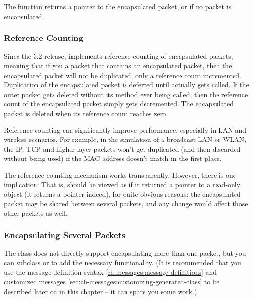 The  function returns a pointer to the encapsulated
packet, or  if no packet is encapsulated.


\subsubsection{Reference Counting}
\label{ch:messages:reference-counting}

Since the 3.2 release, {\opp} implements reference counting of
encapsulated packets, meaning that if you  a packet
that contains an encapsulated packet, then the encapsulated packet will
not be duplicated, only a reference count incremented. Duplication of
the encapsulated packet is deferred until 
actually gets called. If the outer packet gets deleted without its
 method ever being called, then the reference
count of the encapsulated packet simply gets decremented. The
encapsulated packet is deleted when its reference count reaches
zero.

Reference counting can significantly improve performance, especially
in LAN and wireless scenarios. For example, in the simulation of a
broadcast LAN or WLAN, the IP, TCP and higher layer packets won't
get duplicated (and then discarded without being used) if the
MAC address doesn't match in the first place.

The reference counting mechanism works transparently. However, there
is one implication:  That is,
 should be viewed as if it returned a
pointer to a read-only object (it returns a  pointer
indeed), for quite obvious reasons: the encapsulated packet may be
shared between several packets, and any change would affect those
other packets as well.


\subsubsection{Encapsulating Several Packets}

The  class does not directly support encapsulating more
than one packet, but you can subclass  or 
to add the necessary functionality. (It is recommended that you
use the message definition syntax \ref{ch:messages:message-definitions}
and customized messages \ref{sec:ch-messages:customizing-generated-class}
to be described later on in this chapter -- it can spare you some work.)

